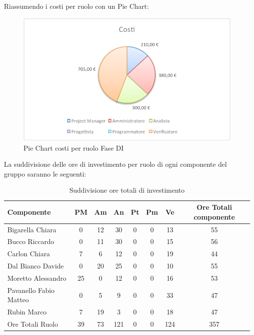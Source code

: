 				Riassumendo i costi per ruolo con un Pie Chart:
				\begin{figure}[H]\centering
					\includegraphics[width=\textwidth]{PianoDiProgetto/Pics/ChartTotCostiFaseDI.pdf}
					\caption{Pie Chart costi per ruolo Fase DI}
				\end{figure}		
				La suddivisione delle ore di investimento per ruolo di ogni componente del gruppo \groupname{} saranno le seguenti:
				\begin{table}[H]
					\begin{center}
						\begin{tabular}{| l | c | c | c | c | c | c | c |}
							\hline
							Componente 					& PM	& Am 		& An 		& Pt 	& Pm 	& Ve 		& Ore Totali componente \\ \hline
							
							Bigarella Chiara 			& 0		& 12 		& 30 		& 0		& 0		& 13 		& 55 \\
							Bucco Riccardo 				& 0		& 11 		& 30 		& 0		& 0		& 15 		& 56 \\
							Carlon Chiara	 			& 7 	& 6 		& 12 		& 0		& 0		& 19 		& 44 \\
							Dal Bianco Davide 			& 0		& 20 		& 25 		& 0		& 0		& 10 		& 55 \\
							Moretto Alessandro 			& 25 	& 0			& 12 		& 0		& 0		& 16 		& 53 \\
							Pavanello Fabio Matteo	 	& 0		& 5 		& 9 		& 0		& 0		& 33 		& 47 \\
							Rubin Marco					& 7 	& 19 		& 3 		& 0		& 0		& 18 		& 47 \\ \hline \hline
							
							Ore Totali Ruolo 			& 39 	& 73 		& 121	 	& 0		& 0		& 124 		& 357\\ \hline
						\end{tabular}
					\end{center}
					\caption{Suddivisione ore totali di investimento}
				\end{table}
